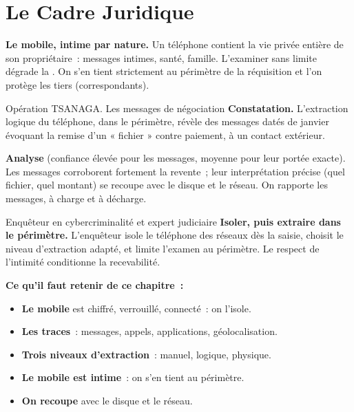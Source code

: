 \section{Le Cadre Juridique}
\label{sec:c14-droit}

\begin{boxCRO}
\textbf{Le mobile, intime par nature.} Un téléphone contient la vie privée
entière de son propriétaire~: messages intimes, santé, famille. L'examiner
sans limite dégrade la . On s'en tient strictement au périmètre
de la réquisition et l'on protège les tiers (correspondants).
\end{boxCRO}

\begin{boxscenario}{Opération TSANAGA. Les messages de négociation}
\textbf{Constatation.} L'extraction logique du téléphone, dans le périmètre,
révèle des messages datés de janvier évoquant la remise d'un « fichier » contre
paiement, à un contact extérieur.

\medskip
\textbf{Analyse} (confiance élevée pour les messages, moyenne pour leur
portée exacte). Les messages corroborent fortement la revente~; leur
interprétation précise (quel fichier, quel montant) se recoupe avec le disque
et le réseau. On rapporte les messages, à charge et à décharge.
\end{boxscenario}

\begin{boxmetier}{Enquêteur en cybercriminalité et expert judiciaire}
\textbf{Isoler, puis extraire dans le périmètre.} L'enquêteur isole le
téléphone des réseaux dès la saisie, choisit le niveau d'extraction adapté, et
limite l'examen au périmètre. Le respect de l'intimité conditionne la
recevabilité.
\end{boxmetier}

\separateur

\begin{boxresume}
\textbf{Ce qu'il faut retenir de ce chapitre~:}
\begin{itemize}
    \item \textbf{Le mobile} est chiffré, verrouillé, connecté~: on l'isole.
    \item \textbf{Les traces}~: messages, appels, applications,
          géolocalisation.
    \item \textbf{Trois niveaux d'extraction}~: manuel, logique, physique.
    \item \textbf{Le mobile est intime}~: on s'en tient au périmètre.
    \item \textbf{On recoupe} avec le disque et le réseau.
\end{itemize}
\end{boxresume}

